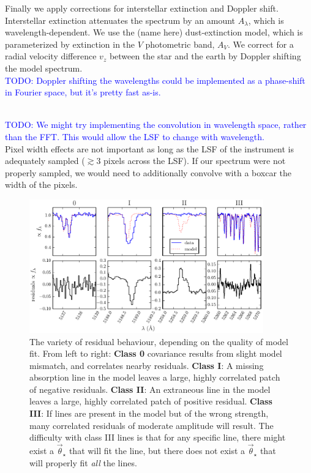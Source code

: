 \documentclass[iop,floatfix]{emulateapj}
\newcommand{\vt}{\vec{\theta}}
\newcommand{\vstar}{\vt_{\star}}
\newcommand{\todo}[1]{ \textcolor{Blue}{\\TODO: #1}}
\begin{document}
Finally we apply corrections for interstellar extinction and Doppler shift.
Interstellar extinction attenuates the spectrum by an amount $A_\lambda$, which
is wavelength-dependent. 
We use the (name here) dust-extinction model, which is parameterized by
 extinction in the $V$ photometric band, $A_V$. 
We correct for a radial velocity difference $v_z$ between the star and the
 earth by Doppler shifting the model spectrum. 
\todo{Doppler shifting the wavelengths could be implemented as a phase-shift in
 Fourier space, but it's pretty fast as-is.}

\todo{We might try implementing the convolution in wavelength space, rather
 than the FFT. 
This would allow the LSF to change with wavelength.\\} 
Pixel width effects are not important as long as the LSF of the instrument is
 adequately sampled ($\gtrsim 3$ pixels across the LSF). 
If our spectrum were not properly sampled, we would need to additionally
 convolve with a boxcar the width of the pixels.

\begin{figure}[!htb]
\begin{center}
  \includegraphics[width=0.9\textwidth]{figs/badlines.pdf}
  \caption{The variety of residual behaviour, depending on the quality of model
    fit. 
    From left to right: \textbf{Class 0} covariance results from slight
     model mismatch, and correlates nearby residuals. 
    \textbf{Class I}: A missing absorption line in the model leaves a large,
     highly correlated patch of negative residuals. 
    \textbf{Class II}: An extraneous line in the model leaves a large, highly
     correlated patch of positive residual.  
    \textbf{Class III}: If lines are present in the model but of the wrong
     strength, many correlated residuals of moderate amplitude will result. 
    The difficulty with class III lines is that for any specific line, there might
     exist a $\vstar$ that will fit the line, but there does not exist a
     $\vstar$ that will properly fit \emph{all} the lines.}
\label{fig:badlines}
\end{center}
\end{figure}
\end{document}
